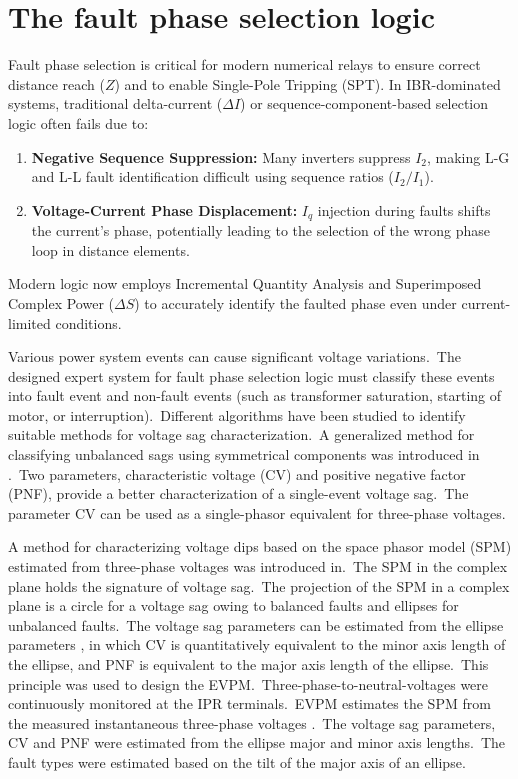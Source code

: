 
\section{The fault phase selection logic}
Fault phase selection is critical for modern numerical relays to ensure correct distance reach ($Z$) and to enable Single-Pole Tripping (SPT). In IBR-dominated systems, traditional delta-current ($\Delta I$) or sequence-component-based selection logic often fails due to:
\begin{enumerate}
    \item \textbf{Negative Sequence Suppression:} Many inverters suppress $I_2$, making L-G and L-L fault identification difficult using sequence ratios ($I_2/I_1$).
    \item \textbf{Voltage-Current Phase Displacement:} $I_q$ injection during faults shifts the current's phase, potentially leading to the selection of the wrong phase loop in distance elements.
\end{enumerate}
Modern logic now employs Incremental Quantity Analysis and Superimposed Complex Power ($\Delta S$) to accurately identify the faulted phase even under current-limited conditions.

Various power system events can cause significant voltage variations.~The designed expert system for fault phase selection logic must classify these events into fault event and non-fault events (such as transformer saturation, starting of motor, or interruption).~Different algorithms have been studied to identify suitable methods for voltage sag characterization.~A generalized method for classifying unbalanced sags using symmetrical components was introduced in .~Two parameters, characteristic voltage (CV) and positive negative factor (PNF), provide a better characterization of a single-event voltage sag.~The parameter CV can be used as a single-phasor equivalent for three-phase voltages.

A method for characterizing voltage dips based on the space phasor model (SPM) estimated from three-phase voltages was introduced in.~The SPM in the complex plane holds the signature of voltage sag.~The projection of the SPM in a complex plane is a circle for a voltage sag owing to balanced faults and ellipses for unbalanced faults.~The voltage sag parameters can be estimated from the ellipse parameters , in which CV is quantitatively equivalent to the minor axis length of the ellipse, and PNF is equivalent to the major axis length of the ellipse.~This principle was used to design the EVPM.~Three-phase-to-neutral-voltages were continuously monitored at the IPR terminals.~EVPM estimates the SPM from the measured instantaneous three-phase voltages .~The voltage sag parameters, CV and PNF were estimated from the ellipse major and minor axis lengths.~The fault types were estimated based on the tilt of the major axis of an ellipse.

